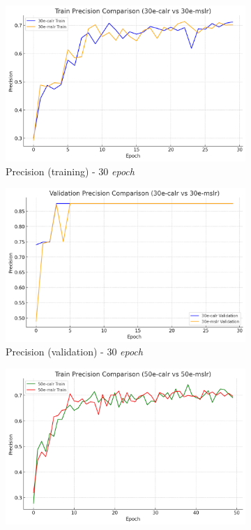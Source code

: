 \begin{figure}[htbp]
  \centering
  \begin{subfigure}{0.45\textwidth}
    \includegraphics[width=\textwidth]{gambar/bab4-train-precision-30e.png}
    \caption{Precision (training) - 30 \emph{epoch}}
  \end{subfigure}
  \hfill
  \begin{subfigure}{0.45\textwidth}
    \includegraphics[width=\textwidth]{gambar/bab4-val-precision-30e.png}
    \caption{Precision (validation) - 30 \emph{epoch}}
  \end{subfigure}
  \hfill
  \begin{subfigure}{0.45\textwidth}
    \includegraphics[width=\textwidth]{gambar/bab4-train-precision-50e.png}

\end{subfigure}
\end{figure}
